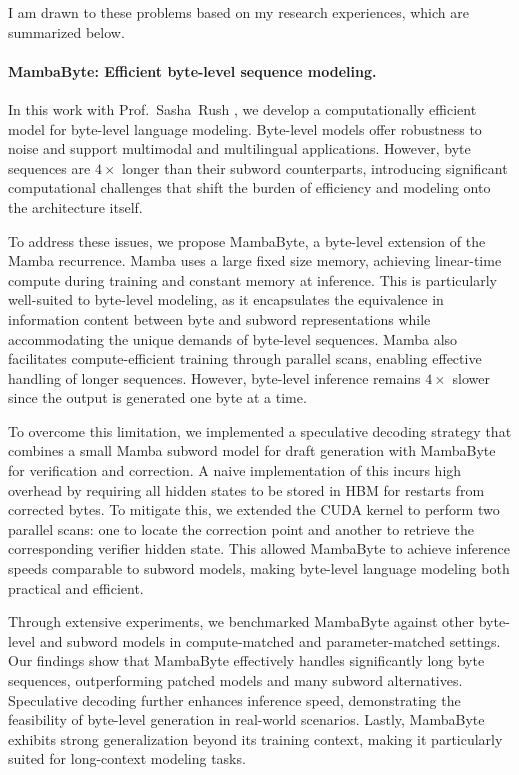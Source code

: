 
I am drawn to these problems based on my research experiences, which are summarized below.

\paragraph{MambaByte: Efficient byte-level sequence modeling.}
%
In this work with Prof.~Sasha~Rush \citep{wang_mambabyte_2024}, we develop a computationally efficient model for byte-level language modeling.
% 
Byte-level models offer robustness to noise and support multimodal and multilingual applications.
% 
However, byte sequences are $4\times$ longer than their subword counterparts, introducing significant computational challenges that shift the burden of efficiency and modeling onto the architecture itself.

To address these issues, we propose MambaByte, a byte-level extension of the Mamba recurrence.
% 
Mamba uses a large fixed size memory, achieving linear-time compute during training and constant memory at inference.
% 
This is particularly well-suited to byte-level modeling, as it encapsulates the equivalence in information content between byte and subword representations while accommodating the unique demands of byte-level sequences.
% 
Mamba also facilitates compute-efficient training through parallel scans, enabling effective handling of longer sequences.
%
However, byte-level inference remains $4\times$ slower since the output is generated one byte at a time.

To overcome this limitation, we implemented a speculative decoding strategy that combines a small Mamba subword model for draft generation with MambaByte for verification and correction.
% 
A naive implementation of this incurs high overhead by requiring all hidden states to be stored in HBM for restarts from corrected bytes.
%
To mitigate this, we extended the CUDA kernel to perform two parallel scans: one to locate the correction point and another to retrieve the corresponding verifier hidden state.
%
This allowed MambaByte to achieve inference speeds comparable to subword models, making byte-level language modeling both practical and efficient.

Through extensive experiments, we benchmarked MambaByte against other byte-level and subword models in compute-matched and parameter-matched settings.
% 
Our findings show that MambaByte effectively handles significantly long byte sequences, outperforming patched models and many subword alternatives. 
% 
Speculative decoding further enhances inference speed, demonstrating the feasibility of byte-level generation in real-world scenarios.
% 
Lastly, MambaByte exhibits strong generalization beyond its training context, making it particularly suited for long-context modeling tasks.

